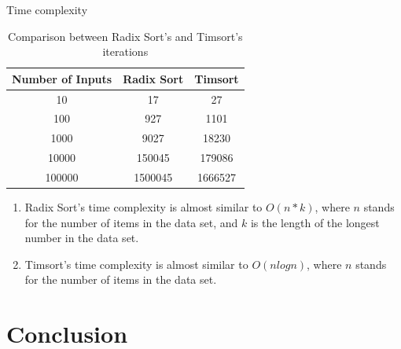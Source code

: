 \documentclass{beamer}
\begin{document}
\begin{frame}{Time complexity}
    \begin{table}[h]
        \centering
        \caption{Comparison between Radix Sort's and Timsort's iterations}
        \begin{tabular}{|c|c|c|}
            \textbf{Number of Inputs} & \textbf{Radix Sort} & \textbf{Timsort} \\
            \hline
            10                        & 17                  & 27               \\
            \hline
            100                       & 927                 & 1101             \\
            \hline
            1000                      & 9027                & 18230            \\
            \hline
            10000                     & 150045              & 179086           \\
            \hline
            100000                    & 1500045             & 1666527          \\
            \hline
        \end{tabular}
    \end{table}
    \begin{enumerate}
        \item Radix Sort's time complexity is almost similar to $O(n * k)$, where $n$ stands for the number of items in the data set, and $k$ is the length of the longest number in the data set.
        \item Timsort's time complexity is almost similar to $O(n log n)$, where $n$ stands for the number of items in the data set\cite{khairullah2013enhancing}.

    \end{enumerate}
\end{frame}

\section{Conclusion}
\end{document}
